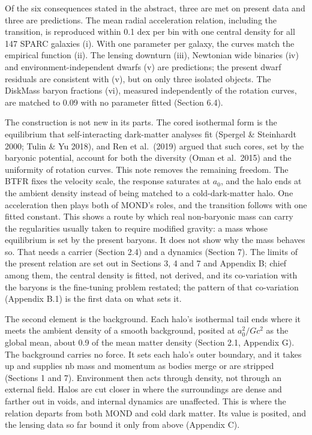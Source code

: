 \documentclass[
  10pt,
]{article}
\begin{document}
Of the six consequences stated in the abstract, three are met on present data and three are predictions. The mean radial acceleration relation, including the transition, is reproduced within 0.1 dex per bin with one central density for all 147 SPARC galaxies (i). With one parameter per galaxy, the curves match the empirical function (ii). The lensing downturn (iii), Newtonian wide binaries (iv) and environment-independent dwarfs (v) are predictions; the present dwarf residuals are consistent with (v), but on only three isolated objects. The DiskMass baryon fractions (vi), measured independently of the rotation curves, are matched to 0.09 with no parameter fitted (Section 6.4).

The construction is not new in its parts. The cored isothermal form is the equilibrium that self-interacting dark-matter analyses fit (Spergel \& Steinhardt 2000; Tulin \& Yu 2018), and Ren et al.~(2019) argued that such cores, set by the baryonic potential, account for both the diversity (Oman et al.~2015) and the uniformity of rotation curves. This note removes the remaining freedom. The BTFR fixes the velocity scale, the response saturates at $a_0$, and the halo ends at the ambient density instead of being matched to a cold-dark-matter halo. One acceleration then plays both of MOND's roles, and the transition follows with one fitted constant. This shows a route by which real non-baryonic mass can carry the regularities usually taken to require modified gravity: a mass whose equilibrium is set by the present baryons. It does not show why the mass behaves so. That needs a carrier (Section 2.4) and a dynamics (Section 7). The limits of the present relation are set out in Sections 3, 4 and 7 and Appendix B; chief among them, the central density is fitted, not derived, and its co-variation with the baryons is the fine-tuning problem restated; the pattern of that co-variation (Appendix B.1) is the first data on what sets it.

The second element is the background. Each halo's isothermal tail ends where it meets the ambient density of a smooth background, posited at $a_0^2/Gc^2$ as the global mean, about 0.9 of the mean matter density (Section 2.1, Appendix G). The background carries no force. It sets each halo's outer boundary, and it takes up and supplies nb mass and momentum as bodies merge or are stripped (Sections 1 and 7). Environment then acts through density, not through an external field. Halos are cut closer in where the surroundings are dense and farther out in voids, and internal dynamics are unaffected. This is where the relation departs from both MOND and cold dark matter. Its value is posited, and the lensing data so far bound it only from above (Appendix C).
\end{document}
